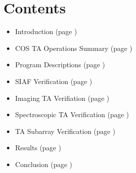 \section*{Contents}

\begin{itemize}
\item Introduction (page \pageref{sec:Introduction})
\item COS TA Operations Summary (page \pageref{sec:TAoperations})
\item Program Descriptions (page \pageref{sec:programs})
\item SIAF Verification (page \pageref{sec:siaf})
\item Imaging TA Verifiation (page \pageref{sec:NimVER})
\item Spectroscopic TA Verification (page \pageref{sec:spVER})
\item TA Subarray Verification (page \pageref{sec:subarray})
\item Results (page \pageref{sec:results})
\item Conclusion (page \pageref{sec:theend})
\end{itemize}
\clearpage
